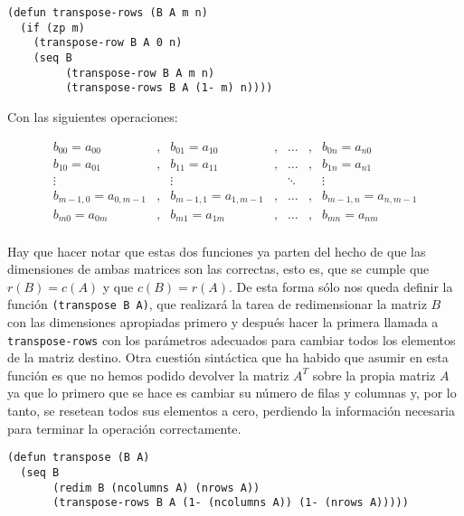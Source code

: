 \documentclass[a4paper,10pt]{article}
\begin{document}
\begin{lstlisting}[language=clips]
(defun transpose-rows (B A m n)
  (if (zp m)
    (transpose-row B A 0 n)
    (seq B
         (transpose-row B A m n)
         (transpose-rows B A (1- m) n))))
\end{lstlisting}

\par \vspace{10pt}	

Con las siguientes operaciones:

\par \vspace{10pt}	

$$
\begin{array}{ccccccccc}
b_{00} = a_{00} & , & b_{01} = a_{10} & , & \dots & , & b_{0n} = a_{n0} \\
b_{10} = a_{01} & , & b_{11} = a_{11} & , & \dots & , & b_{1n} = a_{n1} \\
\vdots & & \vdots & & \ddots & & \vdots\\
b_{m-1,0} = a_{0,m-1} & , & b_{m-1,1} = a_{1,m-1} & , & \dots & , & b_{m-1,n} = a_{n,m-1} \\
b_{m0} = a_{0m} & , & b_{m1} = a_{1m} & , & \dots & , & b_{mn} = a_{nm} \\
\end{array}
$$

\par \vspace{10pt}	

Hay que hacer notar que estas dos funciones ya parten del hecho de que las dimensiones de ambas matrices son las correctas, esto es, que se cumple que $r(B) = c(A)$ y que $c(B) = r(A)$. De esta forma sólo nos queda definir la función \texttt{(transpose B A)}, que realizará la tarea de redimensionar la matriz $B$ con las dimensiones apropiadas primero y después hacer la primera llamada a \texttt{transpose-rows} con los parámetros adecuados para cambiar todos los elementos de la matriz destino. Otra cuestión sintáctica que ha habido que asumir en esta función es que no hemos podido devolver la matriz $A^T$ sobre la propia matriz $A$ ya que lo primero que se hace es cambiar su número de filas y columnas y, por lo tanto, se resetean todos sus elementos a cero, perdiendo la información necesaria para terminar la operación correctamente.

\par \vspace{10pt}

\begin{lstlisting}[language=clips]
(defun transpose (B A)
  (seq B
       (redim B (ncolumns A) (nrows A))
       (transpose-rows B A (1- (ncolumns A)) (1- (nrows A)))))
\end{lstlisting}
\end{document}
